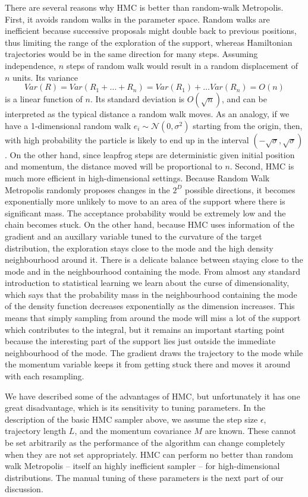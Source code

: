 \documentclass[]{report}
\begin{document}
There are several reasons why HMC is better than random-walk Metropolis. First,
it avoids random walks in the parameter space. Random walks are inefficient because successive
proposals might double back to previous positions, thus limiting the range of
the exploration of the support, whereas Hamiltonian trajectories would be in the
same direction for many steps. Assuming independence, $n$ steps of random walk
would result in a random displacement of $n$ units. Its variance  
\[Var(R) = Var(R_1 + \dots + R_n) = Var(R_1) + \dots Var(R_n) = O(n) \]
is a linear function of $n$. Its standard deviation is $O(\sqrt{n})$, and can be
interpreted as the typical distance a random walk moves. As an analogy, if we
have a 1-dimensional random walk $e_i \sim \mathcal{N}(0,\sigma^2)$ starting from
the origin, then,  with high probability the particle is likely to end up in the
interval $(-\sqrt{\sigma},\sqrt{\sigma})$. 
On the other hand, since leapfrog steps are deterministic given initial position
and momentum, the distance moved will be proportional to $n$. 
Second, HMC is much more efficient in
high-dimensional settings. Because Random Walk Metropolis randomly proposes changes in
the $2^D$ possible directions, it becomes exponentially more unlikely to move
to an area of the support where there is significant mass. The acceptance
probability would be extremely low and the chain becomes stuck. On the other
hand, because HMC uses information of the gradient and an auxillary variable
tuned to the curvature of the target distribution, the exploration stays close
to the mode and the high density neighbourhood around it. There is a delicate
balance between staying close to the mode and in the neighbourhood containing
the mode. From almost any standard introduction to statistical learning \cite{friedman2001elements} we learn about the curse of dimensionality, which says that the probability mass in the neighbourhood containing the mode of the density function decreases exponentially as the dimension increases. This means that simply sampling from around the mode will miss a lot of the support which contributes to the integral, but it remains an important starting point because the interesting part of the support lies just outside the immediate neighbourhood of the mode. The gradient draws the
trajectory to
the mode while the momentum variable keeps it from getting stuck there and moves it around with each resampling.



We have described some of the advantages of HMC, but unfortunately it has one great disadvantage, which is its sensitivity to tuning parameters. 
In the description of the basic HMC sampler above, we assume the step size $\epsilon$, trajectory length $L$, and the momentum covariance $M$ are known. These cannot be set arbitrarily as the performance of the algorithm can change completely when they are not set appropriately. HMC can perform no better than random walk Metropolis -- itself an highly inefficient sampler -- for high-dimensional distributions. The manual tuning of these parameters is the next part of our discussion. 
\end{document}
